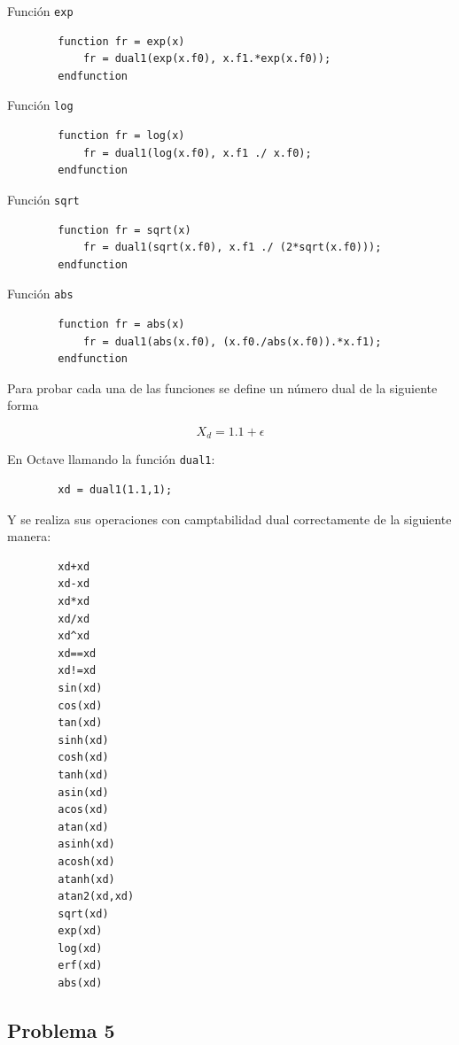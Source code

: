 \documentclass[a4paper, 12pt]{article}
\begin{document}
    Función \verb|exp|

    \begin{verbatim}
        function fr = exp(x)
            fr = dual1(exp(x.f0), x.f1.*exp(x.f0));
        endfunction
    \end{verbatim}

    Función \verb|log|

    \begin{verbatim}
        function fr = log(x)
            fr = dual1(log(x.f0), x.f1 ./ x.f0);
        endfunction
    \end{verbatim}

    Función \verb|sqrt|

    \begin{verbatim}
        function fr = sqrt(x)
            fr = dual1(sqrt(x.f0), x.f1 ./ (2*sqrt(x.f0)));
        endfunction
    \end{verbatim}

    Función \verb|abs|

    \begin{verbatim}
        function fr = abs(x)
            fr = dual1(abs(x.f0), (x.f0./abs(x.f0)).*x.f1);
        endfunction
    \end{verbatim}

    Para probar cada una de las funciones se define un número dual de la siguiente forma

    \[
        X_d = 1.1 + \epsilon
    \]

    En Octave llamando la función \verb|dual1|:

    \begin{verbatim}
        xd = dual1(1.1,1);
    \end{verbatim}

    Y se realiza sus operaciones con camptabilidad dual correctamente de la siguiente manera:

    \begin{verbatim}
        xd+xd
        xd-xd
        xd*xd
        xd/xd
        xd^xd
        xd==xd
        xd!=xd
        sin(xd)
        cos(xd)
        tan(xd)
        sinh(xd)
        cosh(xd)
        tanh(xd)
        asin(xd)
        acos(xd)
        atan(xd)
        asinh(xd)
        acosh(xd)
        atanh(xd)
        atan2(xd,xd)
        sqrt(xd)
        exp(xd)
        log(xd)
        erf(xd)
        abs(xd)
    \end{verbatim}

    \subsection{Problema 5}
\end{document}
